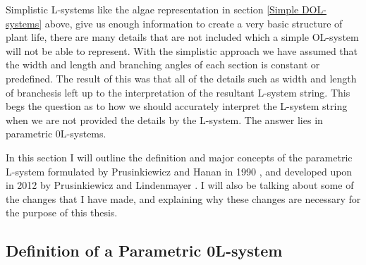 \begin{flushleft}

Simplistic L-systems like the algae representation in section \ref{Simple DOL-systems} above, give us enough information to create a very basic structure of plant life, there are many details that are not included which a simple OL-system will not be able to represent. With the simplistic approach we have assumed that the width and length and branching angles of each section is constant or predefined. The result of this was that all of the details such as width and length of branchesis left up to the interpretation of the resultant L-system string. This begs the question as to how we should accurately interpret the L-system string when we are not provided the details by the L-system. The answer lies in parametric 0L-systems.

\vspace{5mm}

In this section I will outline the definition and major concepts of the parametric L-system formulated by Prusinkiewicz and Hanan in 1990 \cite{prusinkiewicz1990visualization}, and developed upon in 2012 by Prusinkiewicz and Lindenmayer \cite{prusinkiewicz2012algorithmic}. I will also be talking about some of the changes that I have made, and explaining why these changes are necessary for the purpose of this thesis.

\end{flushleft}

\subsection{Definition of a Parametric 0L-system}

